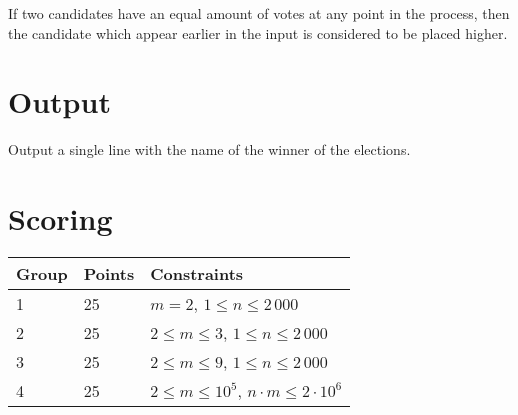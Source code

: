 If two candidates have an equal amount of votes at any point in the process, then the candidate which appear earlier in the input is considered to be placed higher.

\section*{Output}
Output a single line with the name of the winner of the elections.

\section*{Scoring}
\begin{tabular}{|l|l|l|}
\hline
Group & Points & Constraints \\ \hline
1     & 25     & $m = 2$, $1 \leq n \leq 2\,000$ \\ \hline
2     & 25     & $2 \leq m \leq 3$, $1 \leq n \leq 2\,000$ \\ \hline
3     & 25     & $2 \leq m \leq 9$, $1 \leq n \leq 2\,000$ \\ \hline
4     & 25     & $2 \leq m \leq 10^5$, $n \cdot m \leq 2 \cdot 10^6$ \\ \hline
\end{tabular}
